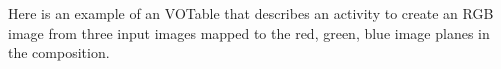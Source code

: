 
Here is an example of an  VOTable that describes an activity to create an RGB image from three input images mapped to the red, green, blue image planes in the composition. 

